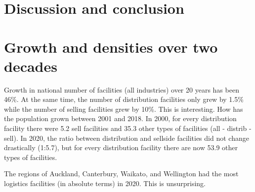 \documentclass[3p, a4paper, authoryear, 11pt, fleqn, review]{elsarticle}
\newcommand{\nmt}[1]{{\color{ForestGreen}{~(nmt: #1)}}}
\begin{document}
\section{Discussion and conclusion}
\label{sec:DiscConc}

\nmt{Remember to highlight methodological novelties}

\section{Growth and densities over two decades}

Growth in national number of facilities (all industries) over 20 years has been 46\%. At the same time, the number of distribution facilities only grew by 1.5\% while the number of selling facilities grew by 10\%. This is interesting. How has the population grown between 2001 and 2018. In 2000, for every distribution facility there were 5.2 sell facilities and 35.3 other types of facilities (all - distrib - sell). In 2020, the ratio between distribution and sellside facilities did not change drastically (1:5.7), but for every distribution facility there are now 53.9 other types of facilities. \nmt{What is the significance of that?} 

The regions of Auckland, Canterbury, Waikato, and Wellington had the most logistics facilities (in absolute terms) in 2020. This is unsurprising. 
\end{document}
